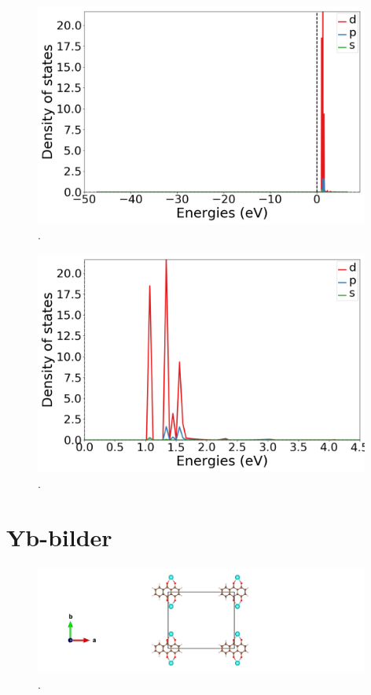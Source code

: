 \documentclass{article}
\begin{document}
  \begin{figure}[H]
      \centering
      \includegraphics[width = 11cm]{../fig/Y_k4_LDOS26_1.png}
      \caption{. }
      \label{fig:Y_k4_LDOS26_1.png}
  \end{figure}

  \begin{figure}[H]
      \centering
      \includegraphics[width = 11cm]{../fig/Y_k4_LDOS26_2.png}
      \caption{. }
      \label{fig:Y_k4_LDOS26_2.png}
  \end{figure}

\vspace{1cm}

\section{Yb-bilder}

  \begin{figure}[H]
      \centering
      \includegraphics[width = 11cm]{../fig/Yb_staticbefore_CONTCAR.png}
      \caption{. }
      \label{fig:Yb_staticbefore_CONTCAR}
  \end{figure}
\end{document}
